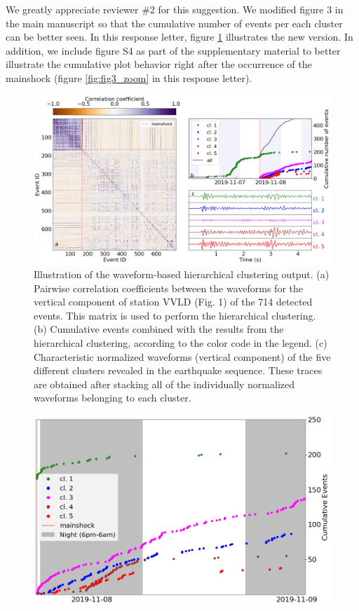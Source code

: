 \documentclass[10pt]{extarticle}
\begin{document}
\begin{Answer}
We greatly appreciate reviewer \#2 for this suggestion. We modified figure 3 in the main manuscript so that the cumulative number of events per each cluster can be better seen. In this response letter, figure \ref{fig:fig3_improved} illustrates the new version. In addition, we include figure S4 as part of the supplementary material to better illustrate the cumulative plot behavior right after the occurrence of the mainshock (figure \ref{fig:fig3_zoom} in this response letter). 
\begin{figure}[!h]
\begin{center}
 \includegraphics[width=1\linewidth]{wigg_cc_mat_cluster.png} 
 \caption{Illustration of the waveform-based hierarchical clustering output. (a) Pairwise correlation coefficients between the waveforms for the vertical component of station VVLD (Fig. 1) of the 714 detected events. This matrix is used to perform the hierarchical clustering. (b) Cumulative events combined with the results from the hierarchical clustering, according to the color code in the legend. (c) Characteristic normalized waveforms (vertical component) of the five different clusters revealed in the earthquake sequence. These traces are obtained after stacking all of the individually normalized waveforms belonging to each cluster.}
\end{center}
\label{fig:fig3_improved}
\end{figure}
\begin{figure}[!h]
\begin{center}
 \includegraphics[width=1\linewidth]{S4_cumulative_per_cluster_zoom.png} 

\end{center}
\end{figure}
\end{Answer}
\end{document}
